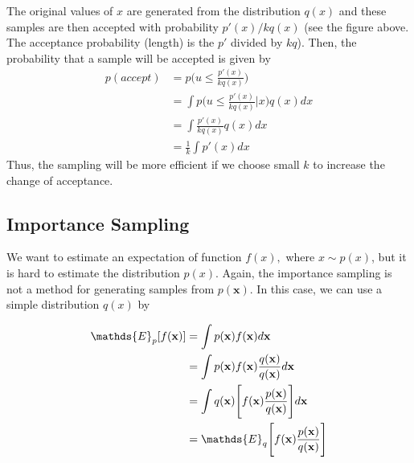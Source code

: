 	The original values of $x$ are generated from the distribution $q(x)$ and these samples are then accepted with probability $p'(x)/kq(x)$ (see the figure above. The acceptance probability (\ie length) is the $p'$ divided by $kq$). Then, the probability that a sample will be accepted is given by   
	\begin{align*}
	p(accept) &= p\Bigg(u\leq \frac{p'(x)}{kq(x)}\Bigg)\\
	&= \int p\Bigg(u\leq \frac{p'(x)}{kq(x)}\bigg|x\Bigg)q(x)dx\\
	& = \int \frac{p'(x)}{kq(x)}q(x)dx\\
	& = \frac{1}{k}\int p'(x)dx
	\end{align*}
	Thus, the sampling will be more efficient if we choose small $k$ to increase the change of acceptance. 

\subsection{Importance Sampling}

We want to estimate an expectation of function $f(x),$ where $x\sim p(x)$, but it is hard to estimate the distribution $p(x)$. Again, the importance sampling is not a method for generating samples from $p(\mathbf{x})$. In this case, we can use a simple distribution $q(x)$ by

\begin{align*}
	\mathds{E}_p[f(\bf x)] &=  \int p(\mathbf{x}) f(\mathbf{x}) d\rvx\\
	&= \int p(\mathbf{x}) f(\mathbf{x}) \frac{q(\rvx)}{q(\rvx)} d\rvx\\
	&= \int q(\rvx) \Bigg[ f(\mathbf{x}) \frac{p(\mathbf{x})}{q(\rvx)}\Bigg] d\rvx\\
	&= \mathds{E}_q\Bigg[ f(\mathbf{x}) \frac{p(\mathbf{x})}{q(\rvx)}\Bigg]
\end{align*}

